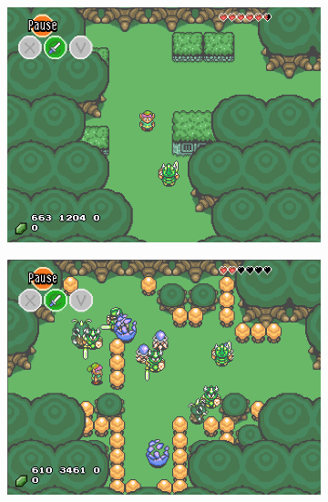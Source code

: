 \documentclass[a4paper]{article}
\begin{document}
\begin{multicols*}{2}
\begin{figure}
\centering
\begin{subfigure}[b]{0.45\textwidth}
  \includegraphics[width=\textwidth]{tutorialroom}
\end{subfigure} \hfill
\begin{subfigure}[b]{0.45\textwidth}
  \includegraphics[width=\textwidth]{forestroom}
\end{subfigure} \hfill
\begin{subfigure}[b]{0.45\textwidth}

\end{subfigure}
\end{figure}
\end{multicols*}
\end{document}
